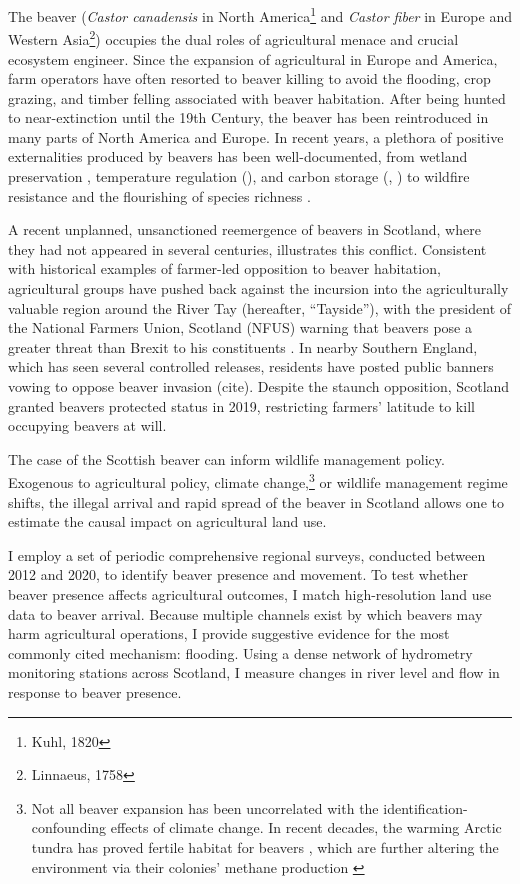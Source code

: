 The beaver (\textit{Castor canadensis} in North America\footnote{Kuhl, 1820} and \textit{Castor fiber} in Europe and Western Asia\footnote{Linnaeus, 1758}) occupies the dual roles of agricultural menace and crucial ecosystem engineer. Since the expansion of agricultural in Europe and America, farm operators have often resorted to beaver killing to avoid the flooding, crop grazing, and timber felling associated with beaver habitation. After being hunted to near-extinction until the 19th Century, the beaver has been reintroduced in many parts of North America and Europe. In recent years, a plethora of positive externalities produced by beavers has been well-documented, from wetland preservation \citep{hood_beaver_2008}, temperature regulation (\cite{dittbrenner_relocated_2022}), and carbon storage (\cite{wohl_landscape-scale_2013}, \cite{johnston_beaver_2014}) to wildfire resistance \citep{fairfax_smokey_2020} and the flourishing of species richness \citep{wright_ecosystem_2002}.

A recent unplanned, unsanctioned reemergence of beavers in Scotland, where they had not appeared in several centuries, illustrates this conflict. Consistent with historical examples of farmer-led opposition to beaver habitation, agricultural groups have pushed back against the incursion into the agriculturally valuable region around the River Tay (hereafter, ``Tayside''), with the president of the National Farmers Union, Scotland (NFUS) warning that beavers pose a greater threat than Brexit to his constituents \citep{castle_beavers_2021}. In nearby Southern England, which has seen several controlled releases, residents have posted public banners vowing to oppose beaver invasion (cite). Despite the staunch opposition, Scotland granted beavers protected status in 2019, restricting farmers' latitude to kill occupying beavers at will.

The case of the Scottish beaver can inform wildlife management policy. Exogenous to agricultural policy, climate change,\footnote{Not all beaver expansion has been uncorrelated with the identification-confounding effects of climate change. In recent decades, the warming Arctic tundra has proved fertile habitat for beavers \citep{tape_expanding_2022}, which are further altering the environment via their colonies' methane production \citep{clark_beaver_2023}} or wildlife management regime shifts, the illegal arrival and rapid spread of the beaver in Scotland  allows one to estimate the causal impact on agricultural land use.

I employ a set of periodic comprehensive regional surveys, conducted between 2012 and 2020, to identify beaver presence and movement. To test whether beaver presence affects agricultural outcomes, I match high-resolution land use data to beaver arrival. Because multiple channels exist by which beavers may harm agricultural operations, I provide suggestive evidence for the most commonly cited mechanism: flooding. Using a dense network of hydrometry monitoring stations across Scotland, I measure changes in river level and flow in response to beaver presence.

